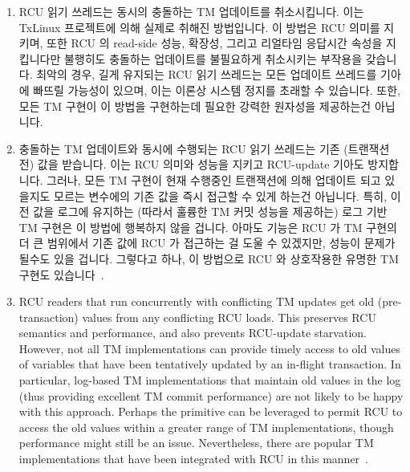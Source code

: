 \begin{enumerate}
\item	RCU 읽기 쓰레드는 동시의 충돌하는 TM 업데이트를 취소시킵니다.
	이는 TxLinux 프로젝트에 의해 실제로 취해진 방법입니다.
	이 방법은 RCU 의미를 지키며, 또한 RCU 의 read-side 성능, 확장성, 그리고
	리얼타임 응답시간 속성을 지킵니다만 불행히도 충돌하는 업데이트를
	불필요하게 취소시키는 부작용을 갖습니다.
	최악의 경우, 길게 유지되는 RCU 읽기 쓰레드는 모든 업데이트 쓰레드를
	기아에 빠뜨릴 가능성이 있으며, 이는 이론상 시스템 정지를 초래할 수
	있습니다.
	또한, 모든 TM 구현이 이 방법을 구현하는데 필요한 강력한 원자성을
	제공하는건 아닙니다.

\item	충돌하는 TM 업데이트와 동시에 수행되는 RCU 읽기 쓰레드는 기존 (트랜잭션
	전) 값을 받습니다.
	이는 RCU 의미와 성능을 지키고 RCU-update 기아도 방지합니다.
	그러나, 모든 TM 구현이 현재 수행중인 트랜잭션에 의해 업데이트 되고
	있을지도 모르는 변수에의 기존 값을 즉시 접근할 수 있게 하는건 아닙니다.
	특히, 이전 값을 로그에 유지하는 (따라서 훌륭한 TM 커밋 성능을 제공하는)
	로그 기반 TM 구현은 이 방법에 행복하지 않을 겁니다.
	아마도  기능은 RCU 가 TM 구현의 더 큰 범위에서
	기존 값에 RCU 가 접근하는 걸 도울 수 있겠지만, 성능이 문제가 될수도
	있을 겁니다.
	그렇다고 하나, 이 방법으로 RCU 와 상호작용한 유명한 TM 구현도
	있습니다~\cite{DonaldEPorter2007TRANSACT,PhilHoward2011RCUTMRBTree,PhilipWHoward2013RCUrbtree}.

\iffalse

\item	RCU readers that run concurrently with conflicting TM updates
	get old (pre-transaction) values from any conflicting RCU loads.
	This preserves RCU semantics and performance, and also prevents
	RCU-update starvation.
	However, not all TM implementations can provide timely access
	to old values of variables that have been tentatively updated
	by an in-flight transaction.
	In particular, log-based TM implementations that maintain
	old values in the log (thus providing excellent TM commit
	performance) are not likely to be happy with this approach.
	Perhaps the  primitive can be leveraged
	to permit RCU to access the old values within a greater range
	of TM implementations, though performance might still be an issue.
	Nevertheless, there are popular TM implementations that have
	been integrated with RCU in this
	manner~\cite{DonaldEPorter2007TRANSACT,PhilHoward2011RCUTMRBTree,
	PhilipWHoward2013RCUrbtree}.


\end{enumerate}
